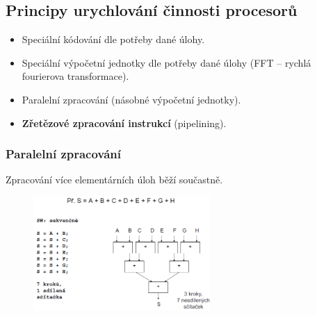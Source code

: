 \pagebreak
\subsection{Principy urychlování činnosti procesorů}
\begin{itemize}
	\item{Speciální kódování dle potřeby dané úlohy}.
	\item{Speciální výpočetní jednotky dle potřeby dané úlohy (FFT -- rychlá fourierova transformace)}.
	\item{Paralelní zpracování (násobné výpočetní jednotky)}.
	\item{\textbf{Zřetězové zpracování instrukcí} (pipelining)}.
\end{itemize}
\subsubsection{Paralelní zpracování}
Zpracování více elementárních úloh běží součastně.
\begin{figure}[H]
\centering
\includegraphics[width=0.6\textwidth]{assets/1_paralelni_zpracovani.png}
\end{figure}


